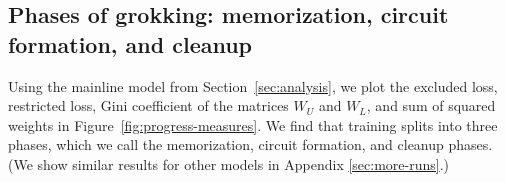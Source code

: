 \documentclass{article} %
\begin{document}







\subsection{Phases of grokking: memorization, circuit formation, and cleanup}

Using the mainline model from Section~\ref{sec:analysis}, we plot the excluded loss, restricted loss, Gini coefficient of the matrices $W_U$ and $W_L$, and sum of squared weights in Figure~\ref{fig:progress-measures}. We find that training splits into three phases, which we call the memorization, circuit formation, and cleanup phases. (We show similar results for other models in Appendix \ref{sec:more-runs}.)
\end{document}
